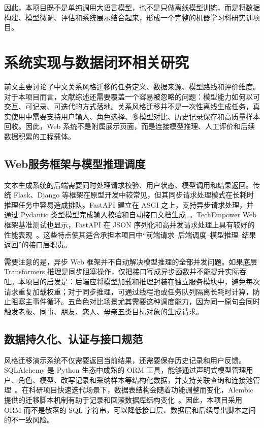 \documentclass[12pt,a4paper]{ctexart}
\begin{document}
因此，本项目既不是单纯调用大语言模型，也不是只做离线模型训练，而是将数据构建、模型微调、评估和系统展示结合起来，形成一个完整的机器学习科研实训项目。

\newpage
\section{系统实现与数据闭环相关研究}

前文主要讨论了中文关系风格迁移的任务定义、数据来源、模型路线和评价维度。对于本项目而言，文献综述还需要覆盖一个容易被忽略的问题：模型能力如何以可交互、可记录、可迭代的方式落地。关系风格迁移并不是一次性离线生成任务，真实使用中需要支持用户输入、角色选择、多模型对比、历史记录保存和高质量样本回收。因此，Web 系统不是附属展示页面，而是连接模型推理、人工评价和后续数据积累的工程载体。

\subsection{Web服务框架与模型推理调度}

文本生成系统的后端需要同时处理请求校验、用户状态、模型调用和结果返回。传统 Flask、Django 等框架在原型开发中较常见，但其同步请求处理模式在长耗时推理任务中容易造成排队。FastAPI 建立在 ASGI 之上，支持异步请求处理，并通过 Pydantic 类型模型完成输入校验和自动接口文档生成~\cite{fastapi2024}。TechEmpower Web 框架基准测试也显示，FastAPI 在 JSON 序列化和高并发请求处理上具有较好的性能表现~\cite{techempower2024}。这些特点使其适合承担本项目中“前端请求--后端调度--模型推理--结果返回”的接口层职责。

需要注意的是，异步 Web 框架并不自动解决模型推理的全部并发问题。如果底层 Transformers 推理是同步阻塞操作，仅把接口写成异步函数并不能提升实际吞吐。本项目的启发是：后端应将模型加载和推理封装在独立服务模块中，避免每次请求重复加载权重；对于同步推理，可通过线程池或任务队列隔离长耗时计算，防止阻塞主事件循环。五角色对比场景尤其需要这种调度能力，因为同一原句会同时触发老板、同事、朋友、恋人、母亲五类目标对象的生成请求。

\subsection{数据持久化、认证与接口规范}

风格迁移演示系统不仅需要返回当前结果，还需要保存历史记录和用户反馈。SQLAlchemy 是 Python 生态中成熟的 ORM 工具，能够通过声明式模型管理用户、角色、模型、改写记录和采纳样本等结构化数据，并支持关联查询和连接池管理~\cite{sqlalchemy2024}。在科研项目快速迭代场景下，数据表结构会随着功能调整而变化，Alembic 提供的迁移脚本机制有助于记录和回滚数据库结构变化~\cite{alembic2024}。因此，本项目采用 ORM 而不是散落的 SQL 字符串，可以降低接口层、数据层和后续导出脚本之间的不一致风险。
\end{document}

